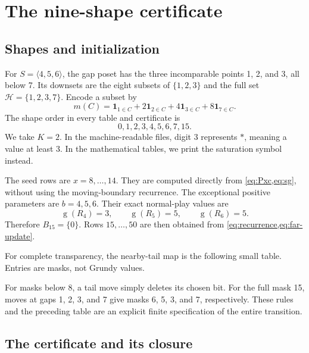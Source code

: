 \documentclass[11pt,letterpaper]{article}
\numberwithin{equation}{section}
\theoremstyle{definition}
\theoremstyle{remark}
\newcommand{\sg}{\operatorname{g}}
\newcommand{\sat}{\ast}
\newcommand{\HH}{\mathcal H}
\begin{document}
\section{The nine-shape certificate}\label{sec:certificate}

\subsection{Shapes and initialization}

For $S=\langle4,5,6\rangle$, the gap poset has the three incomparable
points 1, 2, and 3, all below 7. Its downsets are the eight subsets
of $\{1,2,3\}$ and the full set $\HH=\{1,2,3,7\}$.
Encode a subset by
\[
 m(C)=\mathbf1_{1\in C}+2\mathbf1_{2\in C}
       +4\mathbf1_{3\in C}+8\mathbf1_{7\in C}.
\]
The shape order in every table and certificate is
\begin{equation}\label{eq:shape-order}
 0,1,2,3,4,5,6,7,15.
\end{equation}
We take $K=2$. In the machine-readable files, digit 3 represents
$\sat$, meaning a value at least 3. In the mathematical tables,
we print the saturation symbol instead.

The seed rows are $x=8,\ldots,14$. They are computed directly from
\cref{eq:Pxc,eq:sg}, without using the moving-boundary recurrence.
The exceptional positive parameters are $b=4,5,6$. Their exact
normal-play values are
\begin{equation}\label{eq:small-apery}
 \sg(R_4)=3,\qquad\sg(R_5)=5,\qquad\sg(R_6)=5.
\end{equation}
Therefore $B_{15}=\{0\}$. Rows $15,\ldots,50$ are then obtained
from \cref{eq:recurrence,eq:far-update}.

For complete transparency, the nearby-tail map is the following
small table. Entries are masks, not Grundy values.
\begin{center}

\end{center}
For masks below 8, a tail move simply deletes its chosen bit.
For the full mask 15, moves at gaps 1, 2, 3, and 7 give masks
6, 5, 3, and 7, respectively. These rules and the preceding table
are an explicit finite specification of the entire transition.

\subsection{The certificate and its closure}
\end{document}
